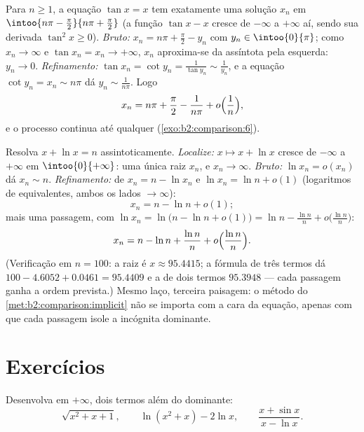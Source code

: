 \begin{example}\label{ex:b2:comparison:tan}
Para $n \geq 1$, a equação $\tan x = x$ tem exatamente uma solução
$x_n$ em $\intoo{n\pi - \frac\pi2}{n\pi + \frac\pi2}$ (a função
$\tan x - x$ cresce de $-\infty$ a $+\infty$ aí, sendo sua
derivada $\tan^2 x \geq 0$). \emph{Bruto:} $x_n = n\pi +
\frac\pi2 - y_n$ com $y_n \in \intoo{0}{\pi}$; como $x_n \to
\infty$ e $\tan x_n = x_n \to +\infty$, $x_n$ aproxima-se da
assíntota pela esquerda: $y_n \to 0$. \emph{Refinamento:} $\tan x_n =
\cot y_n = \frac{1}{\tan y_n} \sim \frac{1}{y_n}$, e a equação
$\cot y_n = x_n \sim n\pi$ dá $y_n \sim \frac{1}{n\pi}$. Logo
\[
x_n = n\pi + \frac\pi2 - \frac{1}{n\pi} +
o\Bigl(\frac1n\Bigr),
\]
e o processo continua até qualquer 
(\cref{exo:b2:comparison:6}).
\end{example}

\begin{example}\label{ex:b2:comparison:xplusln}
Resolva $x + \ln x = n$ assintoticamente. \emph{Localize:} $x
\mapsto x + \ln x$ cresce de $-\infty$ a $+\infty$ em
$\intoo{0}{+\infty}$: uma única raiz $x_n$, e $x_n \to \infty$.
\emph{Bruto:} $\ln x_n = o(x_n)$ dá $x_n \sim n$.
\emph{Refinamento:} de $x_n = n - \ln x_n$ e $\ln x_n = \ln n
+ o(1)$ (logaritmos de equivalentes, ambos os lados $\to \infty$):
\[
x_n = n - \ln n + o(1) ;
\]
mais uma passagem, com $\ln x_n = \ln\bigl(n - \ln n + o(1)\bigr) =
\ln n - \frac{\ln n}{n} + o\bigl(\frac{\ln n}n\bigr)$:
\[
x_n = n - \ln n + \frac{\ln n}{n} +
o\Bigl(\frac{\ln n}{n}\Bigr).
\]
(Verificação em $n = 100$: a raiz é $x \approx 95.4415$; a
fórmula de três termos dá $100 - 4.6052 + 0.0461 = 95.4409$ e a
de dois termos $95.3948$ --- cada passagem ganha a
ordem prevista.) Mesmo laço, terceira paisagem: o método do
\cref{met:b2:comparison:implicit} não se importa com a cara da
equação, apenas com que cada passagem isole a incógnita
dominante.
\end{example}

\section{Exercícios}

\begin{exercise}[$\star$]\label{exo:b2:comparison:1}
Desenvolva em $+\infty$, dois termos além do dominante:
\[
\sqrt{x^2 + x + 1} ,
\qquad
\ln(x^2 + x) - 2\ln x,
\qquad
\frac{x + \sin x}{x - \ln x} .
\]
\end{exercise}

